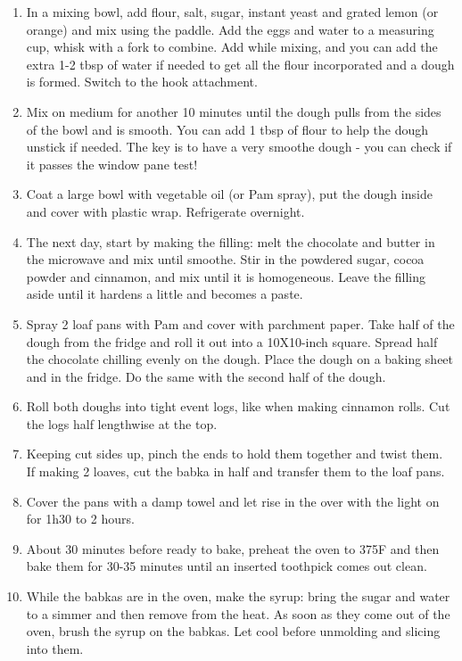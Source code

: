 \begin{enumerate}
    \item In a mixing bowl, add flour, salt, sugar, instant yeast and grated lemon (or orange) and mix using the paddle. Add the eggs and water to a measuring cup, whisk with a fork to combine. Add while mixing, and you can add the extra 1-2 tbsp of water if needed to get all the flour incorporated and a dough is formed. Switch to the hook attachment.
    \item Mix on medium for another 10 minutes until the dough pulls from the sides of the bowl and is smooth. You can add 1 tbsp of flour to help the dough unstick if needed. The key is to have a very smoothe dough - you can check if it passes the window pane test!
    \item Coat a large bowl with vegetable oil (or Pam spray), put the dough inside and cover with plastic wrap. Refrigerate overnight.
    \item The next day, start by making the filling: melt the chocolate and butter in the microwave and mix until smoothe. Stir in the powdered sugar, cocoa powder and cinnamon, and mix until it is homogeneous. Leave the filling aside until it hardens a little and becomes a paste.
    \item Spray 2 loaf pans with Pam and cover with parchment paper. Take half of the dough from the fridge and roll it out into a 10X10-inch square. Spread half the chocolate chilling evenly on the dough. Place the dough on a baking sheet and in the fridge. Do the same with the second half of the dough.
    \item Roll both doughs into tight event logs, like when making cinnamon rolls. Cut the logs half lengthwise at the top.
    \item Keeping cut sides up, pinch the ends to hold them together and twist them. If making 2 loaves, cut the babka in half and transfer them to the loaf pans.
    \item Cover the pans with a damp towel and let rise in the over with the light on for 1h30 to 2 hours.
    \item About 30 minutes before ready to bake, preheat the oven to 375\degree F and then bake them for 30-35 minutes until an inserted toothpick comes out clean.
    \item While the babkas are in the oven, make the syrup: bring the sugar and water to a simmer and then remove from the heat. As soon as they come out of the oven, brush the syrup on the babkas. Let cool before unmolding and slicing into them.
\end{enumerate}

